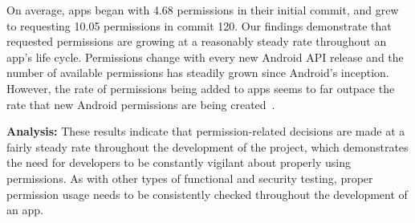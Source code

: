\documentclass{sig-alternate-05-2015}
\newcommand{\todo}[1]{\textcolor{cyan}{\textbf{[#1]}}}
\newcommand{\dan}[1]{\textcolor{blue}{{\it [Dan says: #1]}}}
\begin{document}
On average, apps began with 4.68 permissions in their initial commit, and grew to requesting 10.05 permissions in commit 120. Our findings demonstrate that requested permissions are growing at a reasonably steady rate throughout an app's life cycle. Permissions change with every new Android API release and the number of available permissions has steadily grown since Android's inception. However, the rate of permissions being added to apps seems to far outpace the rate that new Android permissions are being created~\cite{AndroidSystemPermissions_URL}.

\noindent
\textbf{Analysis: }
These results indicate that permission-related decisions are made at a fairly steady rate throughout the development of the project, which demonstrates the need for developers to be constantly vigilant about properly using permissions. As with other types of functional and security testing, proper permission usage needs to be consistently checked throughout the development of an app.







%	






\end{document}
